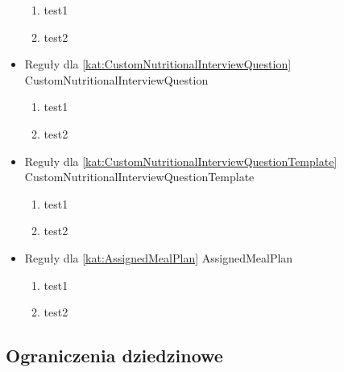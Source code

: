 \begin{itemize}[label={}]
\begin{enumerate}[label={\textbf{REG/\protect\threedigits{\arabic{enumi}}}}, wide, labelwidth=!, resume]
        \item test1
        \item test2
    \end{enumerate}
    \item Reguły dla \ref{kat:CustomNutritionalInterviewQuestion} CustomNutritionalInterviewQuestion
    \begin{enumerate}[label={\textbf{REG/\protect\threedigits{\arabic{enumi}}}}, wide, labelwidth=!, resume]
        \item test1
        \item test2
    \end{enumerate}
    \item Reguły dla \ref{kat:CustomNutritionalInterviewQuestionTemplate} CustomNutritionalInterviewQuestionTemplate
    \begin{enumerate}[label={\textbf{REG/\protect\threedigits{\arabic{enumi}}}}, wide, labelwidth=!, resume]
        \item test1
        \item test2
    \end{enumerate}
    \item Reguły dla \ref{kat:AssignedMealPlan} AssignedMealPlan
    \begin{enumerate}[label={\textbf{REG/\protect\threedigits{\arabic{enumi}}}}, wide, labelwidth=!, resume]
        \item test1
        \item test2
    \end{enumerate}
\end{itemize}

\subsection{Ograniczenia dziedzinowe}

